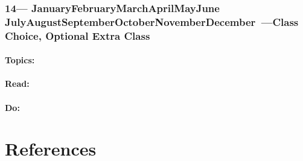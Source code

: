 \documentclass[10pt]{article}
\def\themonth{\ifcase\month\or
	January\or February\or March\or April\or May\or June\or
	July\or August\or September\or October\or November\or December\fi}
\begin{document}
\AdvanceDate[7]
\section{14---\themonth~\the\day---Class Choice, Optional Extra Class}
\subsection{Topics:}
\subsection{Read:}
\subsection{Do:}

\part{References}
%

\end{document}
